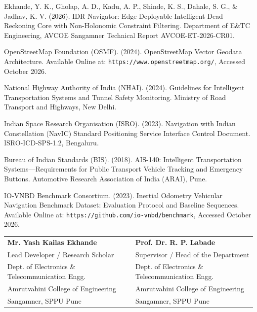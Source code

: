 \documentclass[11pt,a4paper]{article}
\begin{document}
\small
\begin{enumerate}[label={[\arabic*].},leftmargin=0.9cm,itemsep=3.2pt,resume]
\item Ekhande, Y. K., Gholap, A. D., Kadu, A. P., Shinde, K. S., Dahale, S. G., \& Jadhav, K. V. (2026). IDR-Navigator: Edge-Deployable Intelligent Dead Reckoning Core with Non-Holonomic Constraint Filtering. Department of E\&TC Engineering, AVCOE Sangamner Technical Report AVCOE-ET-2026-CR01.
\item OpenStreetMap Foundation (OSMF). (2024). OpenStreetMap Vector Geodata Architecture. Available Online at: \texttt{https://www.openstreetmap.org/}, Accessed October 2026.
\item National Highway Authority of India (NHAI). (2024). Guidelines for Intelligent Transportation Systems and Tunnel Safety Monitoring. Ministry of Road Transport and Highways, New Delhi.
\item Indian Space Research Organisation (ISRO). (2023). Navigation with Indian Constellation (NavIC) Standard Positioning Service Interface Control Document. ISRO-ICD-SPS-1.2, Bengaluru.
\item Bureau of Indian Standards (BIS). (2018). AIS-140: Intelligent Transportation Systems---Requirements for Public Transport Vehicle Tracking and Emergency Buttons. Automotive Research Association of India (ARAI), Pune.
\item IO-VNBD Benchmark Consortium. (2023). Inertial Odometry Vehicular Navigation Benchmark Dataset: Evaluation Protocol and Baseline Sequences. Available Online at: \texttt{https://github.com/io-vnbd/benchmark}, Accessed October 2026.
\end{enumerate}

\vspace{3.0cm}

\normalsize
\begin{center}
\begin{tabular}{p{7.5cm}cp{7.5cm}}
\textbf{Mr. Yash Kailas Ekhande} & \hspace{0.5cm} & \textbf{Prof. Dr. R. P. Labade} \\[0.1cm]
Lead Developer / Research Scholar & & Supervisor / Head of the Department \\[0.1cm]
Dept. of Electronics \& Telecommunication Engg. & & Dept. of Electronics \& Telecommunication Engg. \\[0.1cm]
Amrutvahini College of Engineering & & Amrutvahini College of Engineering \\[0.1cm]
Sangamner, SPPU Pune & & Sangamner, SPPU Pune
\end{tabular}
\end{center}

\vfill
\end{document}
